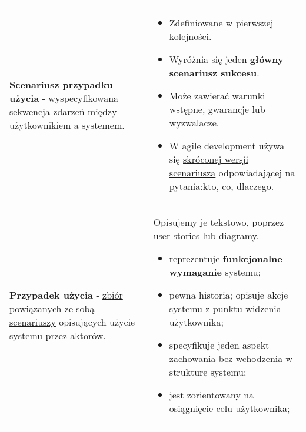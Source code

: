 \documentclass[../main.tex]{subfiles}
\begin{document}
    \begin{table}[H]
        \begin{center}
            \begin{tabular}{  p{6cm} p{10cm}  }

                \textbf{Scenariusz przypadku użycia} - wyspecyfikowana \underline{sekwencja zdarzeń} między użytkownikiem a systemem.
                &
                \begin{itemize}
                    \item Zdefiniowane w pierwszej kolejności.
                    \item Wyróżnia się jeden \textbf{główny scenariusz sukcesu}.
                    \item Może zawierać warunki wstępne, gwarancje lub wyzwalacze.
                    \item W agile development używa się \underline{skróconej wersji scenariusza} odpowiadającej
                    na pytania:kto, co, dlaczego.
                \end{itemize}
                \\

                \cmidrule(r){1-1}\cmidrule(l){2-2}

                \textbf{Przypadek użycia} - \underline{zbiór powiązanych ze sobą scenariuszy} opisujących użycie systemu przez aktorów.
                &
                    Opisujemy je tekstowo, poprzez user stories lub diagramy.
                    \begin{itemize}
                        \item reprezentuje \textbf{funkcjonalne wymaganie} systemu;
                        \item pewna historia; opisuje akcje systemu z punktu widzenia użytkownika;
                        \item specyfikuje jeden aspekt zachowania bez wchodzenia w strukturę systemu;
                        \item jest zorientowany na osiągnięcie celu użytkownika;
                    \end{itemize}
                \\

                \end{tabular}
        \end{center}
    \end{table}
\end{document}
